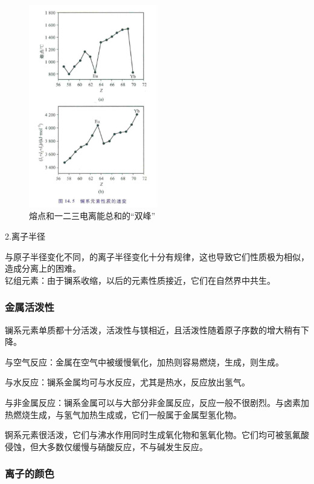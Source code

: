 \documentclass[a4paper,UTF8]{article}
\begin{document}
\begin{figure}[htpb]
	\centering
	\includegraphics[width=0.5\textwidth]{figure//双峰效应2.png}
	\caption{熔点和一二三电离能总和的“双峰”}
	\label{fig:}
\end{figure}

2.离子半径

与原子半径变化不同，的离子半径变化十分有规律，这也导致它们性质极为相似，造成分离上的困难。\\

钇组元素：由于镧系收缩，以后的元素性质接近，它们在自然界中共生。\\

\subsubsection{金属活泼性}

镧系元素单质都十分活泼，活泼性与镁相近，且活泼性随着原子序数的增大稍有下降。

与空气反应：金属在空气中被缓慢氧化，加热则容易燃烧，生成，则生成。

与水反应：镧系金属均可与水反应，尤其是热水，反应放出氢气。

与非金属反应：镧系金属可以与大部分非金属反应，反应一般不很剧烈。与卤素加热燃烧生成，与氢气加热生成或，它们一般属于金属型氢化物。

锕系元素很活泼，它们与沸水作用同时生成氧化物和氢氧化物。它们均可被氢氟酸侵蚀，但大多数仅缓慢与硝酸反应，不与碱发生反应。

\subsubsection{离子的颜色}
\end{document}
